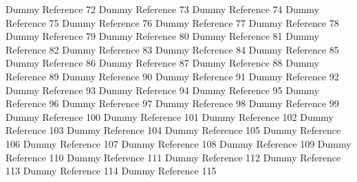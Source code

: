 \documentclass{article}
\begin{document}
\begin{thebibliography}{99}
     Dummy Reference 72
     Dummy Reference 73
     Dummy Reference 74
     Dummy Reference 75
     Dummy Reference 76
     Dummy Reference 77
     Dummy Reference 78
     Dummy Reference 79
     Dummy Reference 80
     Dummy Reference 81
     Dummy Reference 82
     Dummy Reference 83
     Dummy Reference 84
     Dummy Reference 85
     Dummy Reference 86
     Dummy Reference 87
     Dummy Reference 88
     Dummy Reference 89
     Dummy Reference 90
     Dummy Reference 91
     Dummy Reference 92
     Dummy Reference 93
     Dummy Reference 94
     Dummy Reference 95
     Dummy Reference 96
     Dummy Reference 97
     Dummy Reference 98
     Dummy Reference 99
     Dummy Reference 100
     Dummy Reference 101
     Dummy Reference 102
     Dummy Reference 103
     Dummy Reference 104
     Dummy Reference 105
     Dummy Reference 106
     Dummy Reference 107
     Dummy Reference 108
     Dummy Reference 109
     Dummy Reference 110
     Dummy Reference 111
     Dummy Reference 112
     Dummy Reference 113
     Dummy Reference 114
     Dummy Reference 115
\end{thebibliography}
\end{document}
